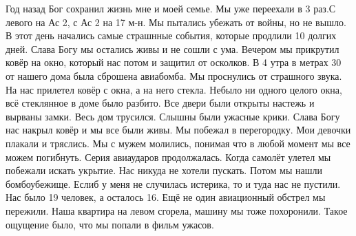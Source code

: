  
 
 
 
 

\qqSecCmt


Год назад Бог сохранил жизнь мне и моей семье. Мы уже переехали в 3 раз.С
левого на Ас 2, с Ас 2 на 17 м-н. Мы пытались убежать от войны, но не вышло. В
этот день начались самые страшнные события, которые продлили 10 долгих дней.
Слава Богу мы остались живы и не сошли с ума. Вечером мы прикрутил ковёр на
окно, который нас потом и защитил от осколков. В 4 утра в метрах 30 от нашего
дома была сброшена авиабомба. Мы проснулись от страшного звука. На нас прилетел
ковёр с окна, а на него стекла. Небыло ни одного целого окна, всё стеклянное в
доме было разбито. Все двери были открыты настежь и вырваны замки. Весь дом
трусился. Слышны были ужасные крики. Слава Богу нас накрыл ковёр и мы все были
живы. Мы побежал в перегородку. Мои девочки плакали и тряслись. Мы с мужем
молились, понимая что в любой момент мы все можем погибнуть. Серия авиаударов
продолжалась. Когда самолёт улетел мы побежали искать укрытие. Нас никуда не
хотели пускать. Потом мы нашли бомбоубежище. Еслиб у меня не случилась
истерика, то и туда нас не пустили. Нас было 19 человек, а осталось 16. Ещё не
один авиационный обстрел мы пережили. Наша квартира на левом сгорела, машину мы
тоже похоронили. Такое ощущение было, что мы попали в фильм ужасов.
